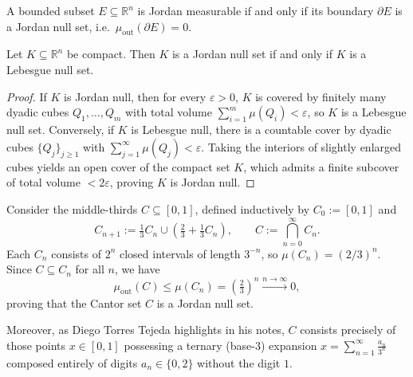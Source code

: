 \begin{theorem}
\label{thm:jordan_measurability_boundary_criterion}
A bounded subset $E \subseteq \mathbb{R}^n$ is Jordan measurable if and only if its boundary $\partial E$ is a Jordan null set, i.e.\ $\mu_{\mathrm{out}}(\partial E) = 0$.
\end{theorem}

\begin{lemma}
\label{lem:compact_jordan_vs_lebesgue_null}
Let $K \subseteq \mathbb{R}^n$ be compact. Then $K$ is a Jordan null set if and only if $K$ is a Lebesgue null set.
\end{lemma}

\begin{proof}
If $K$ is Jordan null, then for every $\varepsilon > 0$, $K$ is covered by finitely many dyadic cubes $Q_1, \dots, Q_m$ with total volume $\sum_{i=1}^m \mu(Q_i) < \varepsilon$, so $K$ is a Lebesgue null set. Conversely, if $K$ is Lebesgue null, there is a countable cover by dyadic cubes $\{Q_j\}_{j \ge 1}$ with $\sum_{j=1}^\infty \mu(Q_j) < \varepsilon$. Taking the interiors of slightly enlarged cubes yields an open cover of the compact set $K$, which admits a finite subcover of total volume $< 2\varepsilon$, proving $K$ is Jordan null.
\end{proof}

\begin{example}
\label{ex:cantor_set_jordan_null}
Consider the middle-thirds  $C \subseteq [0,1]$, defined inductively by $C_0 := [0,1]$ and
\[
C_{n+1} := \tfrac{1}{3} C_n \cup \left( \tfrac{2}{3} + \tfrac{1}{3} C_n \right), \qquad C := \bigcap_{n=0}^\infty C_n.
\]
Each $C_n$ consists of $2^n$ closed intervals of length $3^{-n}$, so $\mu(C_n) = (2/3)^n$. Since $C \subseteq C_n$ for all $n$, we have
\[
\mu_{\mathrm{out}}(C) \leq \mu(C_n) = \left(\tfrac{2}{3}\right)^n \xrightarrow{n\to\infty} 0,
\]
proving that the Cantor set $C$ is a Jordan null set.

Moreover, as Diego Torres Tejeda highlights in his notes, $C$ consists precisely of those points $x \in [0,1]$ possessing a ternary (base-3) expansion $x = \sum_{n=1}^\infty \frac{a_n}{3^n}$ composed entirely of digits $a_n \in \{0, 2\}$ without the digit $1$.
\end{example}

